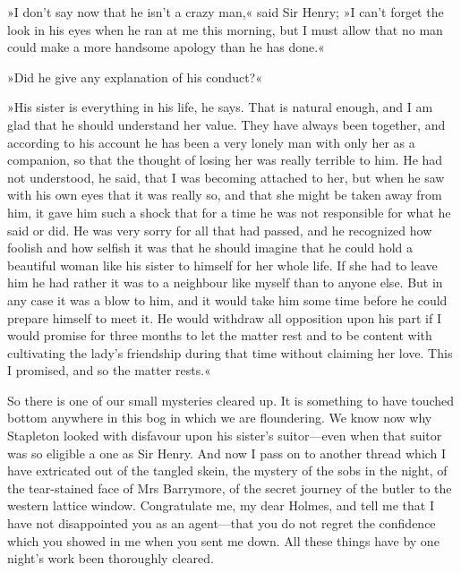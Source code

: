 »I don't say now that he isn't a crazy man,« said Sir Henry; »I can't forget the look in his eyes when he ran at me this morning, but I must allow that no man could make a more handsome apology than he has done.«

»Did he give any explanation of his conduct?«

»His sister is everything in his life, he says. That is natural e\-nough, and I am glad that he should understand her value. They have always been together, and according to his account he has been a very lonely man with only her as a companion, so that the thought of losing her was really terrible to him. He had not understood, he said, that I was becoming attached to her, but when he saw with his own eyes that it was really so, and that she might be taken away from him, it gave him such a shock that for a time he was not responsible for what he said or did. He was very sorry for all that had passed, and he recognized how foolish and how selfish it was that he should imagine that he could hold a beautiful woman like his sister to himself for her whole life. If she had to leave him he had rather it was to a neighbour like myself than to anyone else. But in any case it was a blow to him, and it would take him some time before he could prepare himself to meet it. He would withdraw all opposition upon his part if I would promise for three months to let the matter rest and to be content with cultivating the lady's friendship during that time without claiming her love. This I promised, and so the matter rests.«

So there is one of our small mysteries cleared up. It is something to have touched bottom anywhere in this bog in which we are floundering. We know now why Stapleton looked with disfavour upon his sister's suitor—even when that suitor was so eligible a one as Sir Henry. And now I pass on to another thread which I have extricated out of the tangled skein, the mystery of the sobs in the night, of the tear-stained face of Mrs Barrymore, of the secret journey of the butler to the western lattice window. Congratulate me, my dear Holmes, and tell me that I have not disappointed you as an agent—that you do not regret the confidence which you showed in me when you sent me down. All these things have by one night's work been thoroughly cleared.

